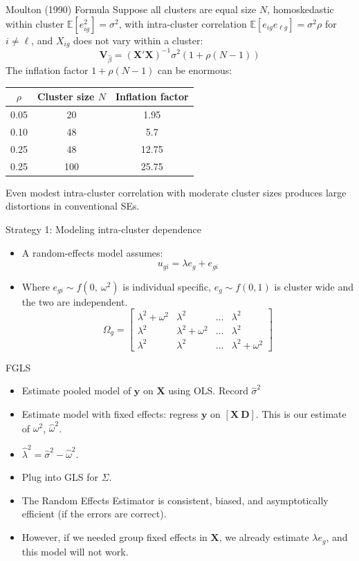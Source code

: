 \documentclass[aspectratio=169, handout, t]{beamer}
\numberwithin{equation}{section}
\begin{document}
\begin{frame}{Moulton (1990) Formula}
Suppose all clusters are equal size $N$, homoskedastic within cluster $\mathbb{E}[e_{ig}^2]=\sigma^2$, with intra-cluster correlation $\mathbb{E}[e_{ig}e_{\ell g}]=\sigma^2\rho$ for $i\neq \ell$, and $X_{ig}$ does not vary within a cluster:
$$\bm{V}_{\hat{\beta}}=\left(\bm{X'X}\right)^{-1}\sigma^2(1+\rho(N-1))$$\pause
The \alert{inflation factor} $1+\rho(N-1)$ can be enormous:
\begin{center}
\begin{tabular}{ccc}
\toprule
$\rho$ & Cluster size $N$ & Inflation factor \\
\midrule
0.05 & 20 & 1.95 \\
0.10 & 48 & 5.7 \\
0.25 & 48 & \alert{12.75} \\
0.25 & 100 & \alert{25.75} \\
\bottomrule
\end{tabular}
\end{center}
Even modest intra-cluster correlation with moderate cluster sizes produces large distortions in conventional SEs.
 \end{frame}
 
\begin{frame}{Strategy 1: Modeling intra-cluster dependence}
\begin{itemize}
\item A random-effects model assumes:
$$u_{gi}=\lambda e_g+e_{gi}$$
\item Where $e_{gi}\sim f(0,\ \omega^2)$ is individual specific, $e_g\sim f(0,1)$ is cluster wide and the two are independent.
$$\Omega_g =\begin{bmatrix} \lambda^2+\omega^2 & \lambda^2& \ldots& \lambda^2\\
\lambda^2 & \lambda^2+\omega^2 & \ldots& \lambda^2\\
\lambda^2& \lambda^2& \ldots& \lambda^2+\omega^2\end{bmatrix}$$

\end{itemize}
\end{frame}
  
\begin{frame}{FGLS}
\begin{itemize}
\item Estimate pooled model of $\bm{y}$ on $\bm{X}$ using OLS.  Record $\hat{\sigma}^2$   \pause
\item Estimate model with fixed effects: regress $\bm{y}$ on $[\bm{X}\ \bm{D}]$. This is our estimate of $\omega^2$, $\hat{\omega}^2$. \pause
\item $\hat{\lambda}^2=\hat{\sigma}^2-\hat{\omega}^2$. \pause
\item Plug into GLS for $\Sigma$. \pause
\item The Random Effects Estimator is consistent, biased, and asymptotically efficient (if the errors are correct). \pause
\item However, if we needed group fixed effects in $\bm{X}$, we already estimate $\lambda e_g$, and this model will not work.
\end{itemize}

\end{frame}
  
\end{document}
